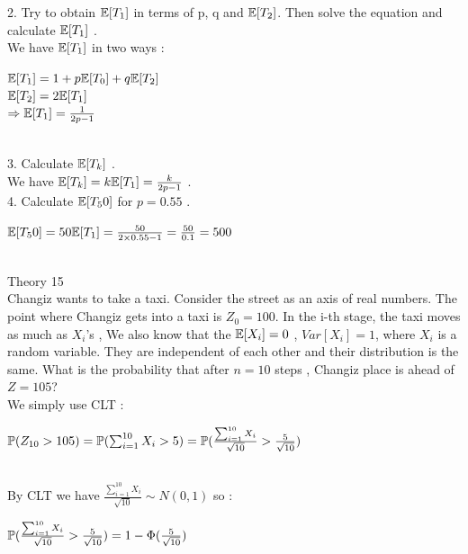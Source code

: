 \documentclass[30pt]{article}
\begin{document}
{\color{blue} {\large 2. }Try to obtain $\Bbb{E}[T_1]$ in terms of p, q and $\Bbb{E}[T_2]$. Then solve the equation and calculate $\Bbb{E}[T_1]$ . } \\ \newline 
We have $\Bbb{E}[T_1]$ in two ways : \\ 
\begin{center}
    $\Bbb{E}[T_1] = 1 + p \Bbb{E}[T_0] + q \Bbb{E}[T_2]$ \\ 
    $\Bbb{E}[T_2] = 2 \Bbb{E}[T_1]$ \\ 
    $\Rightarrow \Bbb{E}[T_1] = \frac{1}{2p - 1} $
\end{center} \\ 
{\color{blue} {\large 3. }Calculate $\Bbb{E}[T_k]$ . } \\ \newline 
We have $\Bbb{E}[T_k] = k \Bbb{E}[T_1] = \frac{k}{2p-1} $ . \\
{\color{blue} {\large 4. }Calculate $\Bbb{E}[T_50]$ for $p = 0.55 $ . } \\ \newline 
\begin{center}
    $\Bbb{E}[T_50] = 50 \Bbb{E}[T_1] = \frac{50}{2\times 0.55 -1} = \frac{50}{0.1} = 500 $
\end{center} \\
{\Large \color{blue} Theory 15 } \\
{\color{blue} Changiz wants to take a taxi. Consider the street as an axis of real numbers. The point where Changiz gets into a taxi is $Z_0 = 100$. In the i-th stage, the taxi moves as much as $X_i$'s ,  We also know that the $\Bbb{E}[X_i] = 0$ , $Var[X_i] = 1$, where $X_i$ is a random variable. They are independent of each other and their distribution is the same. What is the probability that after $n =10 $ steps , Changiz place is ahead of $Z = 105$? } \\ \newline 
We simply use CLT : \\ 
\begin{center}
    $\Bbb{P}(Z_{10} > 105) = \Bbb{P}(\sum_{i=1}^{10}X_i > 5) = \Bbb{P}(\frac{\sum_{i=1}^{10}X_i}{\sqrt{10}} > \frac{5}{\sqrt{10}}) $ \\
\end{center} \\
By CLT we have $\frac{\sum_{i=1}^{10}X_i}{\sqrt{10}} \sim N(0,1) $ so : \\
\begin{center}
    $\Bbb{P}(\frac{\sum_{i=1}^{10}X_i}{\sqrt{10}} > \frac{5}{\sqrt{10}}) = 1 - \Phi(\frac{5}{\sqrt{10}}) $
\end{center} \\
\end{document}
